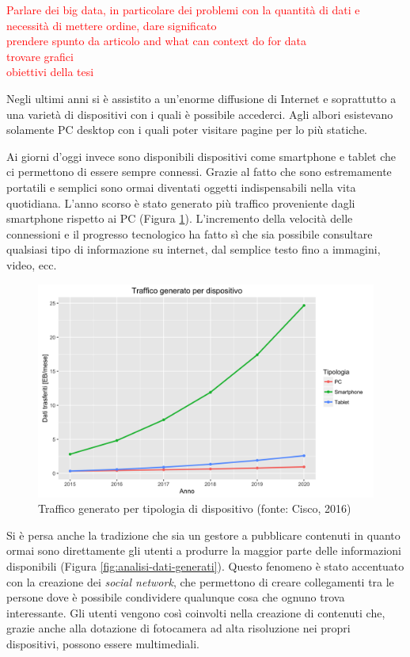 \textcolor{red}{Parlare dei big data, in particolare dei problemi con la quantità di dati e necessità di mettere ordine, dare significato\\
	prendere spunto da articolo and what can context do for data\\
	trovare grafici\\
	obiettivi della tesi}

Negli ultimi anni si è assistito a un'enorme diffusione di Internet e soprattutto a una varietà di dispositivi con i quali è possibile accederci. Agli albori esistevano solamente PC desktop con i quali poter visitare pagine per lo più statiche.

Ai giorni d'oggi invece sono disponibili dispositivi come smartphone e tablet che ci permettono di essere sempre connessi. Grazie al fatto che sono estremamente portatili e semplici sono ormai diventati oggetti indispensabili nella vita quotidiana. L'anno scorso è stato generato più traffico proveniente dagli smartphone rispetto ai PC (Figura \ref{fig:traffico-tipologia-dispositivo}). L'incremento della velocità delle connessioni e il progresso tecnologico ha fatto sì che sia possibile consultare qualsiasi tipo di informazione su internet, dal semplice testo fino a immagini, video, ecc.

\begin{figure}[ht]
	\centering
	\includegraphics[width=\textwidth]{1-introduzione/Immagini/traffico-dispositivi.png}
	\caption[Traffico generato per tipologia di dispositivo]{Traffico generato per tipologia di dispositivo (fonte: Cisco, 2016)\label{fig:traffico-tipologia-dispositivo}}
\end{figure}

Si è persa anche la tradizione che sia un gestore a pubblicare contenuti in quanto ormai sono direttamente gli utenti a produrre la maggior parte delle informazioni disponibili (Figura \ref{fig:analisi-dati-generati}). Questo fenomeno è stato accentuato con la creazione dei \emph{social network}, che permettono di creare collegamenti tra le persone dove è possibile condividere qualunque cosa che ognuno trova interessante. Gli utenti vengono così coinvolti nella creazione di contenuti che, grazie anche alla dotazione di fotocamera ad alta risoluzione nei propri dispositivi, possono essere multimediali. 

